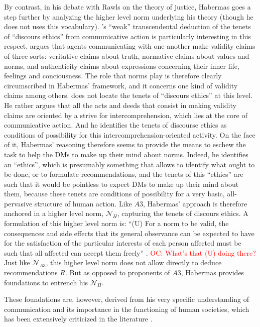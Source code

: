 \documentclass[preprint, french, english, 11pt, authoryear]{elsarticle}%
\newcommand{\commentOC}[1]{\textcolor{red}{OC: #1}}
\begin{document}
By contrast, in his debate with Rawls on the theory of justice, Habermas goes a step further by analyzing the higher level norm underlying his theory (though he does not uses this vocabulary). \cite{habermas_moralbewustsein_1983}'s “weak” transcendental deduction of the tenets of “discours ethics” from communicative action is particularly interesting in this respect. \citet{habermas_theorie_1981} argues that agents communicating with one another make validity claims of three sorts: veritative claims about truth, normative claims about values and norms, and authenticity claims about expressions concerning their inner life, feelings and conciousness. The role that norms play is therefore clearly circumscribed in Habermas' framework, and it concerns one kind of validity claims among others. \cite{habermas_moralbewustsein_1983} does not locate the tenets of “discours ethics” at this level. He rather argues that all the acts and deeds that consist in making validity claims are oriented by a strive for intercomprehension, which lies at the core of communicative action. And he identifies the tenets of discourse ethics as conditions of possibility for this intercomprehension-oriented activity. On the face of it, Habermas' reasoning therefore seems to provide the means to eschew the task to help the \acp{DM} to make up their mind about norms. Indeed, he identifies an “ethics”, which is presumably something that allows to identify what ought to be done, or to formulate recommendations, and the tenets of this “ethics” are such that it would be pointless to expect \acp{DM} to make up their mind about them, because these tenets are conditions of possibility for a very basic, all-pervasive structure of human action. Like $A3$, Habermas' approach is therefore anchored in a higher level norm, $\mathscr{N}_{H}$, capturing the tenets of discours ethics. A formulation of this higher level norm is: “(U) For a norm to be valid, the consequences and side effects that its general observance can be expected to have for the satisfaction of the particular interests of each person affected must be such that all affected can accept them freely” \citep{habermas_moralbewustsein_1983}. \commentOC{What’s that (U) doing there?} Just like $\mathscr{N}_{A3}$, this higher level norm does not allow directly to deduce recommendations $R$. But as opposed to proponents of $A3$, Habermas provides foundations to entrench his $\mathscr{N}_{H}$. 

These foundations are, however, derived from his very specific understanding of communication and its importance in the functioning of human societies, which has been extensively criticized in the literature \citep{heath_communicative_2001,honneth_kritik_1985}. 
\end{document}
